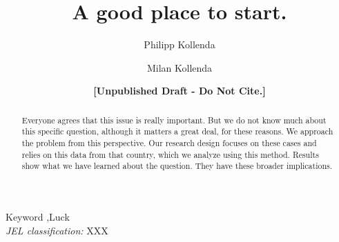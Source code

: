

\begin{frontmatter}
	\title{A good place to start.}
	
	\author[1]{Philipp Kollenda}
	\author{Milan Kollenda}
	\author{\textbf{[Unpublished Draft - Do Not Cite.]}}
	\address[1]{School of Business and Economics, Vrije Universiteit Amsterdam, De Boelelaan 1105, 1081 HV Amsterdam, The Netherlands}
	
	\begin{abstract}
		\noindent Everyone agrees that this issue is really important. But we do not know much about this specific question, although it matters a great deal, for these reasons. We approach the problem from this perspective. Our research design focuses on these cases and relies on this data from that country, which we analyze using this method. Results show what we have learned about the question. They have these broader implications.
	\end{abstract}
	
	\begin{keyword}
		Keyword  \sep Luck \\
		\textit{JEL classification:} XXX
	\end{keyword}
	
\end{frontmatter}